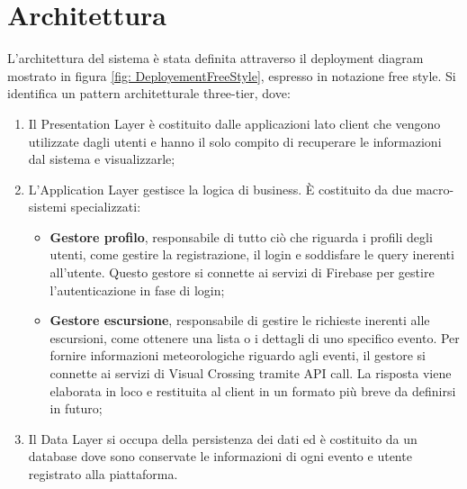 \section{Architettura}

L'architettura del sistema è stata definita attraverso il deployment diagram mostrato in figura \ref{fig: DeployementFreeStyle}, espresso in notazione free style.
Si identifica un pattern architetturale three-tier, dove:
\begin{enumerate}
\item Il Presentation Layer è costituito dalle applicazioni lato client che vengono utilizzate dagli utenti e hanno il solo compito di recuperare le informazioni dal sistema e visualizzarle;
\item L'Application Layer gestisce la logica di business. È costituito da due macro-sistemi specializzati:
\begin{itemize}
    \item \textbf{Gestore profilo}, responsabile di tutto ciò che riguarda i profili degli utenti, come gestire la registrazione, il login
    e soddisfare le query inerenti all'utente. Questo gestore si connette ai servizi di Firebase per gestire l'autenticazione in fase di login;
    \item \textbf{Gestore escursione}, responsabile di gestire le richieste inerenti alle escursioni, come ottenere una lista o i dettagli di uno specifico
    evento. Per fornire informazioni meteorologiche riguardo agli eventi, il gestore si connette ai servizi di Visual Crossing tramite API call. La risposta viene elaborata
    in loco e restituita al client in un formato più breve da definirsi in futuro;
\end{itemize}
\item Il Data Layer si occupa della persistenza dei dati ed è costituito da un database dove sono conservate le informazioni di ogni evento e utente registrato alla 
piattaforma.
\end{enumerate}

